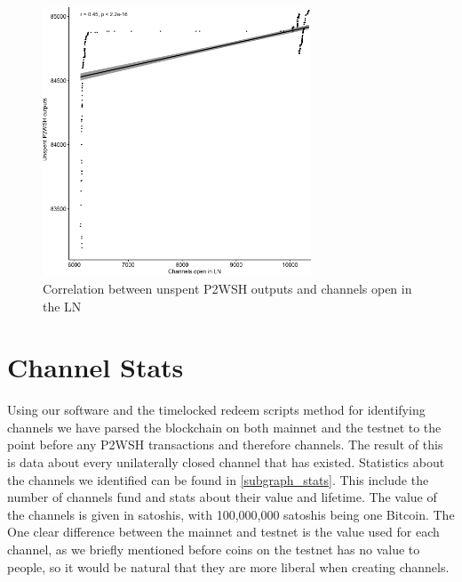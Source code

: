 \begin{figure}[ht]
    \centering
    \includegraphics[width=8cm]{figures/graphs/channel_p2wsh_correlation_testnet.png}
    \caption{Correlation between unspent P2WSH outputs and channels open in the LN}
    \label{fig:correlation_testnet}
\end{figure}


\section{Channel Stats}

Using our software and the timelocked redeem scripts method for identifying channels we have parsed the blockchain on both mainnet and the testnet to the point before any P2WSH transactions and therefore channels. The result of this is data about every unilaterally closed channel that has existed. Statistics about the channels we identified can be found in \cref{subgraph_stats}. This include the number of channels fund and stats about their value and lifetime. The value of the channels is given in satoshis, with 100,000,000 satoshis being one Bitcoin. The One clear difference between the mainnet and testnet is the value used for each channel, as we briefly mentioned before coins on the testnet has no value to people, so it would be natural that they are more liberal when creating channels. 
\\

